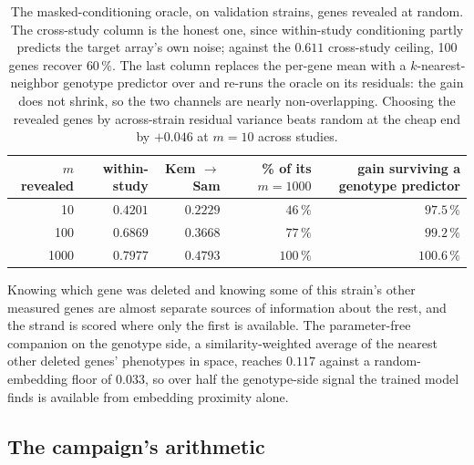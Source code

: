 \begin{table}[htbp]
\centering\small
\begin{tabular}{rrrrr}
\toprule
$m$ revealed & within-study & Kem $\to$ Sam & \% of its $m{=}1000$ & gain surviving a genotype predictor \\
\midrule
10   & $0.4201$ & $0.2229$ & $46\,\%$ & $97.5\,\%$ \\
100  & $0.6869$ & $0.3668$ & $77\,\%$ & $99.2\,\%$ \\
1000 & $0.7977$ & $0.4793$ & $100\,\%$ & $100.6\,\%$ \\
\bottomrule
\end{tabular}
\caption[]{The masked-conditioning oracle,  on validation
strains, genes revealed at random. The cross-study column is the honest one, since
within-study conditioning partly predicts the target array's own noise; against the
$0.611$ cross-study ceiling, 100 genes recover $60\,\%$. The last column replaces the
per-gene mean with a $k$-nearest-neighbor genotype predictor over  and
re-runs the oracle on its residuals: the gain does not shrink, so the two channels are
nearly non-overlapping. Choosing the revealed genes by across-strain residual variance
beats random at the cheap end by $+0.046$ at $m = 10$ across studies.}
\label{tab:strand-oracle}
\end{table}

Knowing which gene was deleted and knowing some of this strain's other measured genes are
almost separate sources of information about the rest, and the strand is scored where
only the first is available. The parameter-free companion on the genotype side, a
similarity-weighted average of the nearest other deleted genes' phenotypes in
 space, reaches $0.117$ against a random-embedding floor of $0.033$, so
over half the genotype-side signal the trained model finds is available from embedding
proximity alone.

\subsection{The campaign's arithmetic}
\label{sec:strand-arithmetic}

